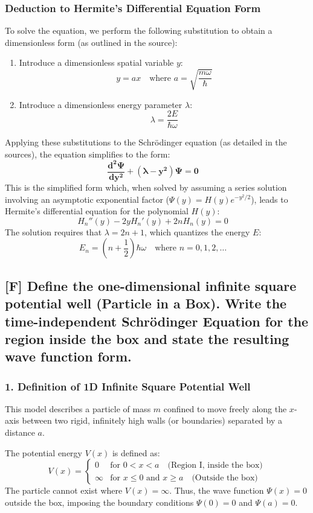\documentclass[12pt]{article}
\begin{document}
\subsubsection*{Deduction to Hermite’s Differential Equation Form}
To solve the equation, we perform the following substitution to obtain a dimensionless form (as outlined in the source):
\begin{enumerate}
    \item Introduce a dimensionless spatial variable $y$:
    $$
    y = ax \quad \text{where } a = \sqrt{\frac{m\omega}{\hbar}}
    $$
    \item Introduce a dimensionless energy parameter $\lambda$:
    $$
    \lambda = \frac{2E}{\hbar\omega}
    $$
\end{enumerate}
Applying these substitutions to the Schrödinger equation (as detailed in the sources), the equation simplifies to the form:
$$
\mathbf{\frac{d^2\Psi}{dy^2} + \left( \lambda - y^2 \right) \Psi = 0} \quad \text{}
$$
This is the simplified form which, when solved by assuming a series solution involving an asymptotic exponential factor ($\Psi(y) = H(y) e^{-y^2/2}$), leads to Hermite's differential equation for the polynomial $H(y)$:
$$
H_n''(y) - 2y H_n'(y) + 2n H_n(y) = 0 \quad \text{}
$$
The solution requires that $\lambda = 2n + 1$, which quantizes the energy $E$:
$$
E_n = \left(n + \frac{1}{2}\right) \hbar\omega \quad \text{where } n = 0, 1, 2, \ldots \quad \text{}
$$

\subsection{[F] Define the one-dimensional infinite square potential well (Particle in a Box). Write the time-independent Schrödinger Equation for the region inside the box and state the resulting wave function form.}

\subsubsection*{1. Definition of 1D Infinite Square Potential Well}
This model describes a particle of mass $m$ confined to move freely along the $x$-axis between two rigid, infinitely high walls (or boundaries) separated by a distance $a$.

The potential energy $V(x)$ is defined as:
$$
V(x) = 
\begin{cases}
0 & \text{for } 0 < x < a \quad \text{(Region I, inside the box)} \\
\infty & \text{for } x \le 0 \text{ and } x \ge a \quad \text{(Outside the box)}
\end{cases}
$$
The particle cannot exist where $V(x) = \infty$. Thus, the wave function $\Psi(x)=0$ outside the box, imposing the boundary conditions $\Psi(0)=0$ and $\Psi(a)=0$.
\end{document}
